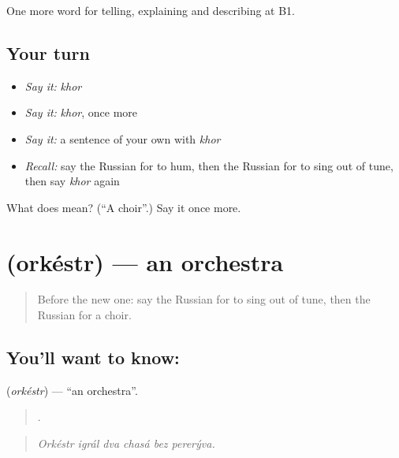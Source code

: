 \begin{grammarlens}[title={What you've built}]
One more word for telling, explaining and describing at B1.
\end{grammarlens}

\subsection*{Your turn}
\begin{itemize}
\raggedright
  \item \emph{Say it:} \emph{khor}
  \item \emph{Say it:} \emph{khor}, once more
  \item \emph{Say it:} a sentence of your own with \emph{khor}
  \item \emph{Recall:} say the Russian for to hum, then the Russian for to sing out of tune, then say \emph{khor} again
\end{itemize}

\begin{tcolorbox}[breakable,colback=teal!4,colframe=teal!35!black,title={Before you move on}]
What does  mean? (\textquotedblleft{}A choir\textquotedblright{}.) Say it once more.
\end{tcolorbox}
\section[\texorpdfstring{\ru{оркестр} (orkéstr)}{оркестр (orkéstr)}]{ (orkéstr) — an orchestra}

\label{lesson:RU-C517-orkestr}



\begin{quote}
Before the new one: say the Russian for to sing out of tune, then the Russian for a choir.
\end{quote}

\subsection*{You'll want to know: }
\textbf{} (\emph{orkéstr}) — \textquotedblleft{}an orchestra\textquotedblright{}.

\begin{quote}
     .
\end{quote}

\begin{quote}
\emph{Orkéstr igrál dva chasá bez pererýva.}
\end{quote}

